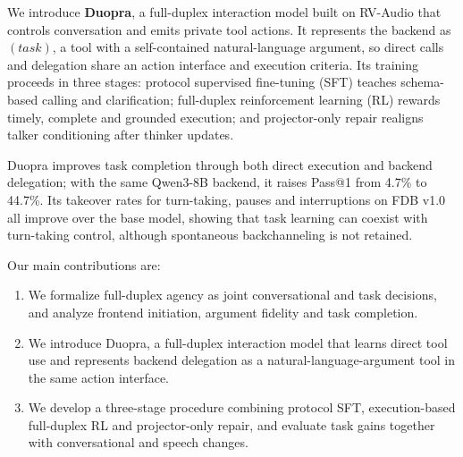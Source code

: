 We introduce \textbf{Duopra}, a full-duplex interaction model built on RV-Audio that controls conversation and emits private tool actions. It represents the backend as $(\textit{task})$, a tool with a self-contained natural-language argument, so direct calls and delegation share an action interface and execution criteria.
Its training proceeds in three stages: protocol supervised fine-tuning (SFT) teaches schema-based calling and clarification; full-duplex reinforcement learning (RL) rewards timely, complete and grounded execution; and projector-only repair realigns talker conditioning after thinker updates.

Duopra improves task completion through both direct execution and backend delegation; with the same Qwen3-8B backend, it raises Pass@1 from 4.7\% to 44.7\%.
Its takeover rates for turn-taking, pauses and interruptions on FDB v1.0 \citep{lin2025fullduplexbench} all improve over the base model, showing that task learning can coexist with turn-taking control, although spontaneous backchanneling is not retained.

Our main contributions are:
\begin{enumerate}
    \item We formalize full-duplex agency as joint conversational and task decisions, and analyze frontend initiation, argument fidelity and task completion.
    \item We introduce Duopra, a full-duplex interaction model that learns direct tool use and represents backend delegation as a natural-language-argument tool in the same action interface.
    \item We develop a three-stage procedure combining protocol SFT, execution-based full-duplex RL and projector-only repair, and evaluate task gains together with conversational and speech changes.
\end{enumerate}